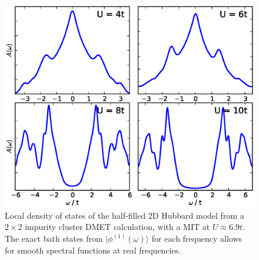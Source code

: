 \documentclass[aps,twocolumn,nobibnotes]{revtex4}
\begin{document}
\begin{figure}
\begin{center}
    \vspace{-2mm}
\includegraphics[scale=0.425]{2DHub_Spectra.eps}
\end{center}
    \vspace{-8mm}
\caption{Local density of states of the half-filled 2D Hubbard model from a $2 \times 2$ impurity cluster DMET calculation, with a 
MIT at $U\approx6.9t$. 
The exact bath states from $|\phi^{(1)}(\omega)\rangle$ for each frequency allows for smooth spectral functions at real frequencies.}
\label{2D_DOS}
\end{figure}
\end{document}
